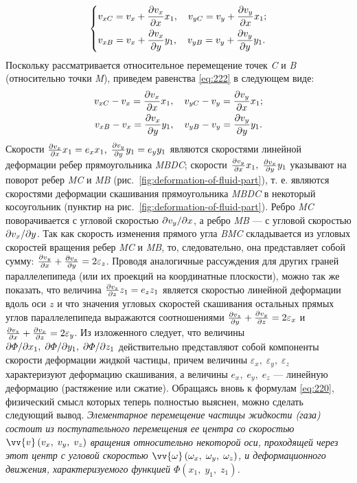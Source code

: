 	\begin{gather}
		\begin{dcases}\label{eq:222}
			v_{xC} = v_x + \frac{\partial v_x}{\partial x}x_1, \quad v_{yC} = v_y + \frac{\partial v_y}{\partial x}x_1;\\
			v_{xB} = v_x + \frac{\partial v_x}{\partial y}y_1, \quad v_{yB} = v_y + \frac{\partial v_y}{\partial y}y_1.
		\end{dcases}
	\end{gather}\n
	Поскольку рассматривается относительное перемещение точек \textit{C} и \textit{B} (относительно точки \textit{M}), приведем равенства \eqref{eq:222} в следующем виде:
	\begin{gather*}
		v_{xC} - v_x = \frac{\partial v_x}{\partial x}x_1, \quad v_{yC} - v_y = \frac{\partial v_y}{\partial x}x_1;\\
		v_{xB} - v_x = \frac{\partial v_x}{\partial y}y_1, \quad v_{yB} - v_y = \frac{\partial v_y}{\partial y}y_1.
	\end{gather*}\n
	Скорости $\frac{\partial v_x}{\partial x}x_1 = e_x x_1,\; \frac{\partial v_y}{\partial y}y_1 = e_y y_1$ являются скоростями линейной деформации ребер прямоугольника \textit{MBDC}; скорости $\frac{\partial v_y}{\partial x}x_1,\; \frac{\partial v_x}{\partial y}y_1$ указывают на поворот ребер \textit{MC} и \textit{MB} (рис.~\ref{fig:deformation-of-fluid-part}), т. е. являются скоростями деформации скашивания прямоугольника \textit{MBDC} в некоторый косоугольник (пунктир на рис.~\ref{fig:deformation-of-fluid-part}). Ребро \textit{MC} поворачивается с угловой скоростью ${\partial v_y}/{\partial x}$, а ребро \textit{MB} --- с угловой скоростью ${\partial v_x}/{\partial y}$. Так как скорость изменения прямого угла \textit{BMC} складывается из угловых скоростей вращения ребер \textit{MC} и \textit{MB}, то, следовательно, она представляет собой сумму: $\frac{\partial v_y}{\partial x} + \frac{\partial v_x}{\partial y} = 2\varepsilon_z$.\n
	Проводя аналогичные рассуждения для других граней параллелепипеда (или их проекций на координатные плоскости), можно так же показать, что величина $\frac{\partial v_z}{\partial z}z_1 = e_z z_1$ является скоростью линейной деформации вдоль оси $z$ и что значения угловых скоростей скашивания остальных прямых углов параллелепипеда выражаются соотношениями $\frac{\partial v_z}{\partial y} + \frac{\partial v_y}{\partial z} = 2\varepsilon_x$ и $\frac{\partial v_z}{\partial x} + \frac{\partial v_x}{\partial z} = 2\varepsilon_y$.\n
	Из изложенного следует, что величины ${\partial \varPhi}/{\partial x_1},\; {\partial \varPhi}/{\partial y_1},\; {\partial \varPhi}/{\partial z_1}$ действительно представляют собой компоненты скорости деформации жидкой частицы, причем величины $\varepsilon_x,\; \varepsilon_y,\; \varepsilon_z$ характеризуют деформацию скашивания, а величины $e_x,\; e_y,\; e_z$ --- линейную деформацию (растяжение или сжатие). Обращаясь вновь к формулам \eqref{eq:220}, физический смысл которых теперь полностью выяснен, можно сделать следующий вывод.\n
	\textit{Элементарное перемещение частицы жидкости (газа) состоит из поступательного перемещения ее центра со скоростью $\vv{v}\left(v_x,\; v_y,\; v_z\right)$ вращения относительно некоторой оси, проходящей через этот центр с угловой скоростью $\vv{\omega}\left(\omega_x,\; \omega_y,\; \omega_z\right)$, и деформационного движения, характеризуемого функцией $\varPhi\left(x_1,\; y_1,\; z_1\right)$.}
	
